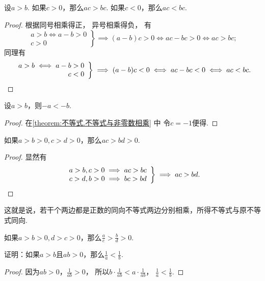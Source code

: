 \begin{theorem}\label{theorem:不等式.不等式与非零数相乘}
设\(a>b\).
如果\(c>0\)，那么\(ac>bc\).
如果\(c<0\)，那么\(ac<bc\).
\begin{proof}
根据同号相乘得正，
异号相乘得负，
有\begin{equation*}
	\left. \begin{array}{r}
		a>b \iff a-b>0 \\
		c>0
	\end{array} \right\}
	\implies (a-b)c>0
	\iff ac-bc>0
	\iff ac>bc;
\end{equation*}
同理有\begin{equation*}
	\left. \begin{array}{r}
		a>b \iff a-b> 0 \\
		c<0
	\end{array} \right\}
	\implies (a-b)c<0
	\iff ac-bc<0
	\iff ac<bc.
	\qedhere
\end{equation*}
\end{proof}
\end{theorem}

\begin{corollary}\label{theorem:不等式.不等式与负一相乘}
设\(a>b\)，则\(-a<-b\).
\begin{proof}
在\cref{theorem:不等式.不等式与非零数相乘} 中
令\(c = -1\)便得.
\end{proof}
\end{corollary}

\begin{corollary}\label{theorem:不等式.同向不等式相乘}
如果\(a>b>0,c>d>0\)，那么\(ac>bd>0\).
\begin{proof}
显然有\begin{equation*}
	\left. \begin{array}{r}
		a>b,c>0 \implies ac>bc \\
		c>d,b>0 \implies bc>bd
	\end{array} \right\}
	\implies ac>bd.
	\qedhere
\end{equation*}
\end{proof}
\end{corollary}
这就是说，若干个两边都是正数的同向不等式两边分别相乘，所得不等式与原不等式同向.

\begin{corollary}
如果\(a>b>0,d>c>0\)，那么\(\frac{a}{c}>\frac{b}{d}>0\).
\end{corollary}

\begin{example}
证明：如果\(a > b\)且\(ab > 0\)，那么\(\frac1a < \frac1b\).
\begin{proof}
因为\(ab > 0\)，\(\frac1{ab} > 0\)，
所以\(b \cdot \frac1{ab} < a \cdot \frac1{ab}\)，
\(\frac1a < \frac1b\).
\end{proof}
\end{example}

